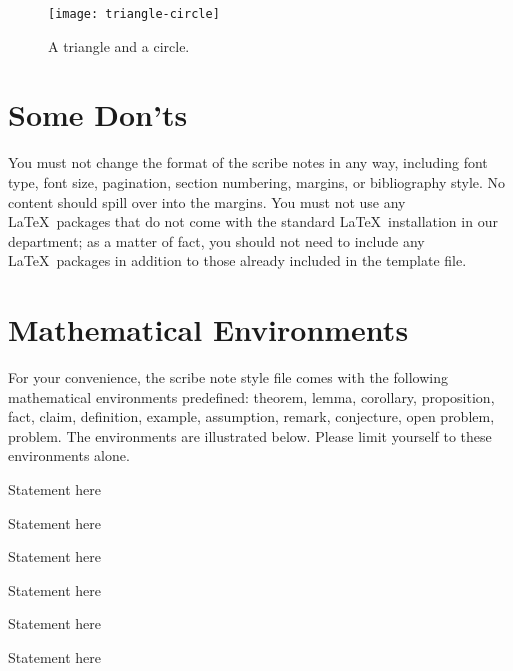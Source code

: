 \begin{figure}
\begin{center}
\texttt{[image: triangle-circle]}
\end{center}
\caption{A triangle and a circle.}
\label{fig:triangle-circle}
\end{figure}

\section{Some Don'ts}
You must not change the format of the scribe notes in
any way, including font type, font size, pagination,
section numbering, margins, or bibliography style. No
content should spill over into the margins. You
must not use any \LaTeX\ packages that do not come with
the standard \LaTeX\ installation in our department;
as a matter of fact, you should not need to include any
\LaTeX\ packages in addition to those already included
in the template file.


\section{Mathematical Environments}

For your convenience, the scribe note style file comes
with the following mathematical environments
predefined: theorem, lemma, corollary, proposition,
fact, claim, definition, example, assumption, remark,
conjecture, open problem, problem. The environments are
illustrated below.  Please limit yourself to these
environments alone.  

\begin{theorem}
Statement here 
\end{theorem}

\begin{lemma}
Statement here
\end{lemma}

\begin{corollary}
Statement here
\end{corollary}

\begin{proposition}
Statement here
\end{proposition}

\begin{fact}
Statement here
\end{fact}

\begin{claim}
Statement here
\end{claim}


